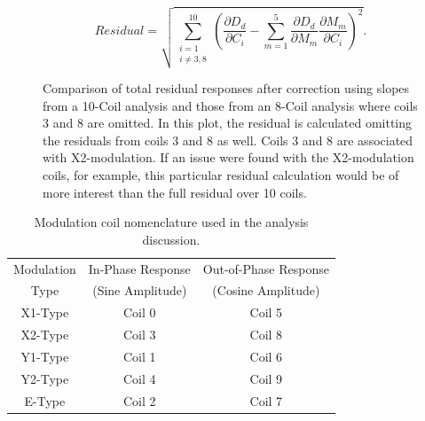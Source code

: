 \[
Residual=\sqrt{\sum\limits_{\substack{i=1\\i\neq 3,8}}^{10}\left(\frac{\partial D_d}{\partial C_i} - \sum_{m=1}^{5}\frac{\partial D_d}{\partial M_m}\frac{\partial M_m}{\partial C_i} \right)^2}.
\]
\begin{figure}[h]

\centering
{}
\caption{Comparison of total residual responses after correction using slopes from a 10-Coil analysis and those from an 8-Coil analysis where coils 3 and 8 are omitted. In this plot, the residual is calculated omitting the residuals from coils 3 and 8 as well. Coils 3 and 8 are associated with X2-modulation. If an issue were found with the X2-modulation coils, for example, this particular residual calculation would be of more interest than the full residual over 10 coils.}
\label{fig:residual_omit38}
\end{figure}


\begin{table}[!h]
\caption{Modulation coil nomenclature used in the analysis discussion.}
\begin{center}
\begin{tabular}[h]{|c||c|c|}\hline
Modulation&In-Phase Response&Out-of-Phase Response\\
Type&(Sine Amplitude)&(Cosine Amplitude)\\\hline\hline
X1-Type&Coil 0&Coil 5\\
X2-Type&Coil 3&Coil 8\\\hline\hline
Y1-Type&Coil 1&Coil 6\\
Y2-Type&Coil 4&Coil 9\\\hline\hline
E-Type&Coil 2&Coil 7\\\hline
\end{tabular}
\end{center}
\label{tab:coil_nomenclature}
\end{table}

